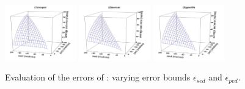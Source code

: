 {\begin{figure}[tb!]
	\centering
	\includegraphics[width= 0.275\textwidth]{figures/Fig-BITT-mopsi-sed-error.png}\hspace{6ex}
	\includegraphics[width= 0.275\textwidth]{figures/Fig-BITT-sercar-sed-error.png}\hspace{6ex}
	\includegraphics[width= 0.275\textwidth]{figures/Fig-BITT-geolife-sed-error.png}\hspace{0ex}
	\vspace{-2ex}
	\caption{\small Evaluation of the \sed errors of \bitt: varying error bounds $\epsilon_{sed}$ and $\epsilon_{ped}$.}
	\label{fig:bitt-sed-error}
	\vspace{-1ex}
\end{figure}



}
